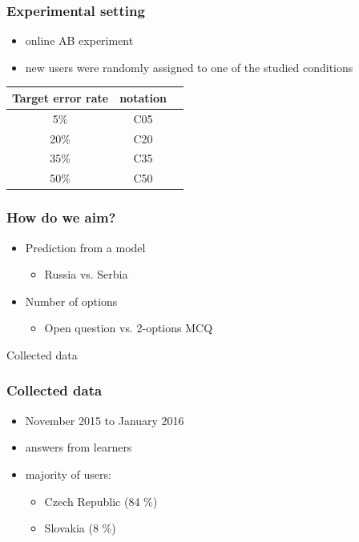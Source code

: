 \documentclass[bigger]{beamer}
\begin{document}
\begin{frame}
  \frametitle{Experimental setting}
	\begin{itemize}
		\item online AB experiment
		\item new users were randomly assigned to one of the studied conditions
	\end{itemize}
	\begin{center}
		\begin{tabular}{ccc}
			\textbf{Target error rate} & \textbf{notation} \\
			\toprule
			 5\% & C05 \\
			 20\%   & C20 \\
			 35\% & C35 \\
			 50\%   & C50 \\
			\bottomrule
		\end{tabular}
	\end{center}
\end{frame}

\begin{frame}
	\frametitle{How do we aim?}
	\begin{itemize}
		\item Prediction from a model
    \begin{itemize}
      \item Russia vs. Serbia
    \end{itemize}
		\item Number of options
    \begin{itemize}
      \item Open question vs. 2-options MCQ
    \end{itemize}
	\end{itemize}
\end{frame}

\begin{frame}
	\begin{center}
    {\Huge Collected data} 
	\end{center}
\end{frame}

\begin{frame}
	\frametitle{Collected data}
	\begin{itemize}
		\item November 2015 to January 2016
		\item {} answers from  learners
		\item majority of users:
			\begin{itemize}
				\item Czech Republic (84 \%)
				\item Slovakia (8 \%)
			\end{itemize}
	\end{itemize}
\end{frame}
\end{document}
